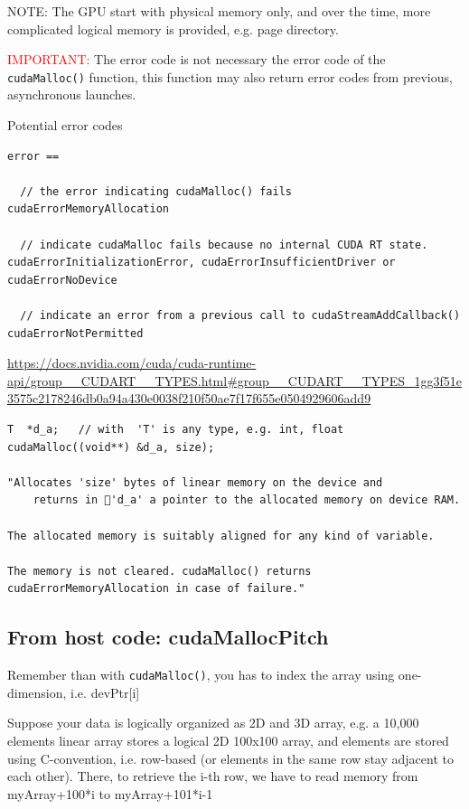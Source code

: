   NOTE: The GPU start with physical memory only, and over the time, more
  complicated logical memory is provided, e.g. page directory.
  
\textcolor{red}{IMPORTANT:} The error code is not necessary the error code of the \verb!cudaMalloc()! function,
this function may also return error codes from previous, asynchronous launches.

Potential error codes
\begin{verbatim}
error ==

  // the error indicating cudaMalloc() fails
cudaErrorMemoryAllocation 
  
  // indicate cudaMalloc fails because no internal CUDA RT state.  
cudaErrorInitializationError, cudaErrorInsufficientDriver or cudaErrorNoDevice 

  // indicate an error from a previous call to cudaStreamAddCallback()
cudaErrorNotPermitted 

\end{verbatim}
\url{https://docs.nvidia.com/cuda/cuda-runtime-api/group__CUDART__TYPES.html#group__CUDART__TYPES_1gg3f51e3575c2178246db0a94a430e0038f210f50ae7f17f655e0504929606add9}



\begin{verbatim}
T  *d_a;   // with  'T' is any type, e.g. int, float
cudaMalloc((void**) &d_a, size);

"Allocates 'size' bytes of linear memory on the device and 
	returns in 'd_a' a pointer to the allocated memory on device RAM.

The allocated memory is suitably aligned for any kind of variable. 

The memory is not cleared. cudaMalloc() returns cudaErrorMemoryAllocation in case of failure."

\end{verbatim}

\subsection{From host code: cudaMallocPitch}
\label{sec:cudaMallocPitch}

Remember than with \verb!cudaMalloc()!, you has to index the array using one-dimension, i.e. devPtr[i]

Suppose your data is logically organized as 2D and 3D array, e.g. a 10,000
elements linear array stores a logical 2D 100x100 array, and elements are stored
using C-convention, i.e. row-based (or elements in the same row stay adjacent to
each other). There, to retrieve the i-th row, we have to read memory from
myArray+100*i to myArray+101*i-1

